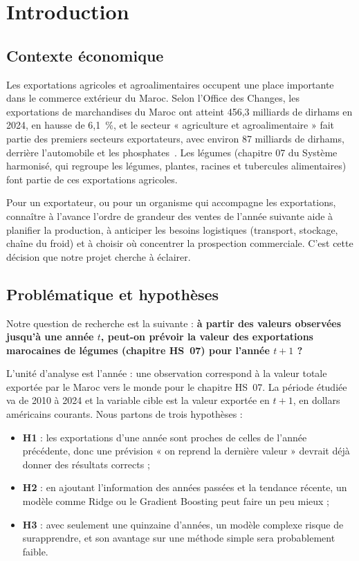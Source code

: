\documentclass[11pt,a4paper]{article}
\begin{document}
\tableofcontents
\newpage

\section{Introduction}\label{sec:intro}

\subsection{Contexte économique}
Les exportations agricoles et agroalimentaires occupent une place importante dans le commerce extérieur du Maroc. Selon l'Office des Changes, les exportations de marchandises du Maroc ont atteint 456,3 milliards de dirhams en 2024, en hausse de 6,1~\%, et le secteur « agriculture et agroalimentaire » fait partie des premiers secteurs exportateurs, avec environ 87 milliards de dirhams, derrière l'automobile et les phosphates~\cite{hespress2025}. Les légumes (chapitre 07 du Système harmonisé, qui regroupe les légumes, plantes, racines et tubercules alimentaires) font partie de ces exportations agricoles.

Pour un exportateur, ou pour un organisme qui accompagne les exportations, connaître à l'avance l'ordre de grandeur des ventes de l'année suivante aide à planifier la production, à anticiper les besoins logistiques (transport, stockage, chaîne du froid) et à choisir où concentrer la prospection commerciale. C'est cette décision que notre projet cherche à éclairer.

\subsection{Problématique et hypothèses}
Notre question de recherche est la suivante : \textbf{à partir des valeurs observées jusqu'à une année $t$, peut-on prévoir la valeur des exportations marocaines de légumes (chapitre HS~07) pour l'année $t+1$ ?}

L'unité d'analyse est l'année : une observation correspond à la valeur totale exportée par le Maroc vers le monde pour le chapitre HS~07. La période étudiée va de 2010 à 2024 et la variable cible est la valeur exportée en $t+1$, en dollars américains courants. Nous partons de trois hypothèses :
\begin{itemize}
\item \textbf{H1} : les exportations d'une année sont proches de celles de l'année précédente, donc une prévision « on reprend la dernière valeur » devrait déjà donner des résultats corrects ;
\item \textbf{H2} : en ajoutant l'information des années passées et la tendance récente, un modèle comme Ridge ou le Gradient Boosting peut faire un peu mieux ;
\item \textbf{H3} : avec seulement une quinzaine d'années, un modèle complexe risque de surapprendre, et son avantage sur une méthode simple sera probablement faible.
\end{itemize}
\end{document}
